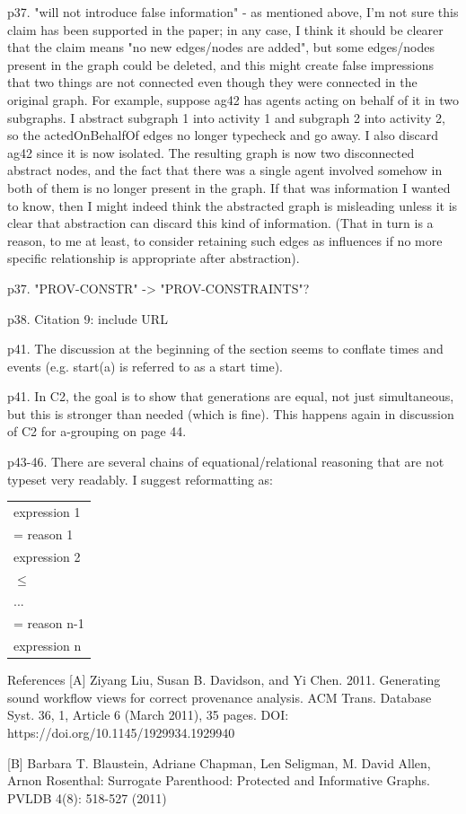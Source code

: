 \documentclass{article}
\newcommand{\showComments}{yes} %
\newcommand{\com}[2]{\ifthenelse{\equal{\showComments}{yes}}{\textcolor{#1}{#2}}{}}
\newcommand{\comment}[1]{\com{red}{#1}}
\begin{document}
p37. "will not introduce false information" - as mentioned above, I'm not sure this claim has been supported in the paper; in any case, I think it should be clearer that the claim means "no new edges/nodes are added", but some edges/nodes present in the graph could be deleted, and this might create false impressions that two things are not connected even though they were connected in the original graph.  For example, suppose ag42 has agents acting on behalf of it in two subgraphs.  I abstract subgraph 1 into activity 1 and subgraph 2 into activity 2, so the actedOnBehalfOf edges no longer typecheck and go away.  I also discard ag42 since it is now isolated.  The resulting graph is now two disconnected abstract nodes, and the fact that there was a single agent involved somehow in both of them is no longer present in the graph.  If that was information I wanted to know, then I might indeed think the abstracted graph is misleading unless it is clear that abstraction can discard this kind of information.  (That in turn is a reason, to me at least, to consider retaining such edges as influences if no more specific relationship is appropriate after abstraction).

\comment{Is the assumption we actually work with that agents are on the ``outside'' of the graph? We should make this clear if so.}

p37. "PROV-CONSTR" -> "PROV-CONSTRAINTS"?

p38. Citation 9: include URL


p41.  The discussion at the beginning of the section seems to conflate times and events (e.g. start(a) is referred to as a start time).

\comment{how do we write ``time at which start(a) occurs''?}

p41. In C2, the goal is to show that generations are equal, not just simultaneous, but this is stronger than needed (which is fine).  This happens again in discussion of C2 for a-grouping on page 44.

p43-46.  There are several chains of equational/relational reasoning that are not typeset very readably.  I suggest reformatting as:

\begin{tabular}{l}
expression 1 \\ 
 = { reason 1} \\
expression 2 \\
 $\leq$ \\
 ... \\
 = {reason n-1} \\
expression n \\
\end{tabular}

References
[A] Ziyang Liu, Susan B. Davidson, and Yi Chen. 2011. Generating sound workflow views for correct provenance analysis. ACM Trans. Database Syst. 36, 1, Article 6 (March 2011), 35 pages. DOI: https://doi.org/10.1145/1929934.1929940

[B] Barbara T. Blaustein, Adriane Chapman, Len Seligman, M. David Allen, Arnon Rosenthal:
Surrogate Parenthood: Protected and Informative Graphs. PVLDB 4(8): 518-527 (2011)
\end{document}
